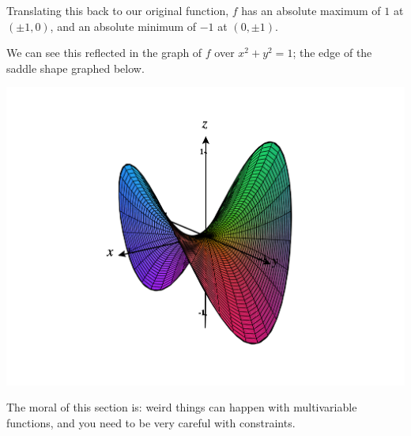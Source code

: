 \documentclass{ximera}
\begin{document}
\begin{example}
Translating this back to our original function, $f$ has an absolute maximum of $1$ at $(\pm 1, 0)$, and an absolute minimum of $-1$ at $(0,\pm 1)$.

We can see this reflected in the graph of $f$ over $x^2+y^2=1$; the edge of the saddle shape graphed below.

\begin{image}
\includegraphics[width=\textwidth]{CalcPlot3D-pringle}
\end{image}

\end{example}

The moral of this section is: weird things can happen with multivariable functions, and you need to be very careful with constraints.
\end{document}
